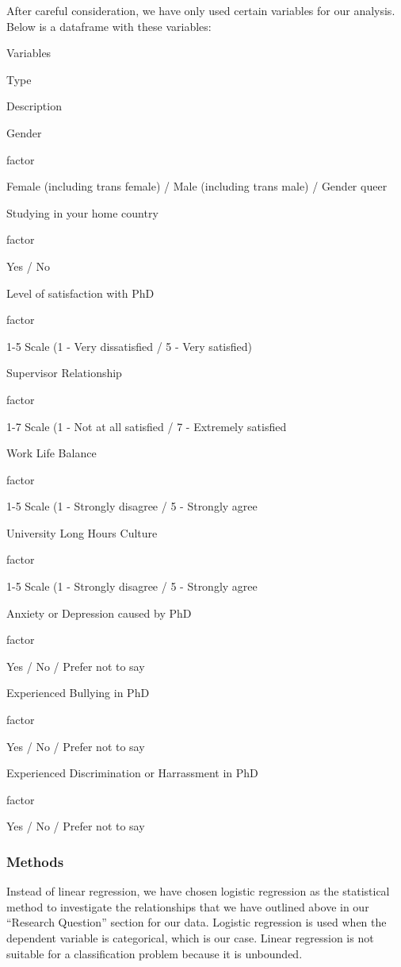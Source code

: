 \documentclass[
]{article}
\begin{document}
After careful consideration, we have only used certain variables for our
analysis. Below is a dataframe with these variables:

Variables

Type

Description

Gender

factor

Female (including trans female) / Male (including trans male) / Gender
queer

Studying in your home country

factor

Yes / No

Level of satisfaction with PhD

factor

1-5 Scale (1 - Very dissatisfied / 5 - Very satisfied)

Supervisor Relationship

factor

1-7 Scale (1 - Not at all satisfied / 7 - Extremely satisfied

Work Life Balance

factor

1-5 Scale (1 - Strongly disagree / 5 - Strongly agree

University Long Hours Culture

factor

1-5 Scale (1 - Strongly disagree / 5 - Strongly agree

Anxiety or Depression caused by PhD

factor

Yes / No / Prefer not to say

Experienced Bullying in PhD

factor

Yes / No / Prefer not to say

Experienced Discrimination or Harrassment in PhD

factor

Yes / No / Prefer not to say

\hypertarget{methods}{%
\subsubsection{Methods}\label{methods}}

Instead of linear regression, we have chosen logistic regression as the
statistical method to investigate the relationships that we have
outlined above in our ``Research Question'' section for our data.
Logistic regression is used when the dependent variable is categorical,
which is our case. Linear regression is not suitable for a
classification problem because it is unbounded.
\end{document}
